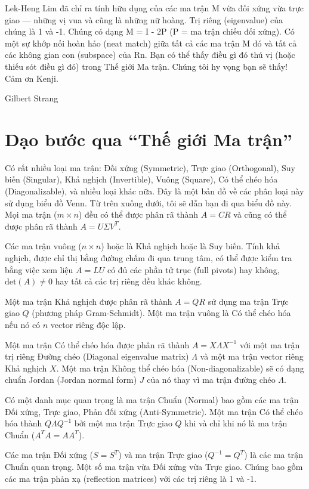 Lek-Heng Lim đã chỉ ra tính hữu dụng của các ma trận M vừa đối xứng vừa trực giao --- những vị vua và cũng là những nữ hoàng. Trị riêng (eigenvalue) của chúng là 1 và -1. Chúng có dạng M = I - 2P (P = ma trận chiếu đối xứng). Có một sự khớp nối hoàn hảo (neat match) giữa tất cả các ma trận M đó và tất cả các không gian con (subspace) của Rn. Bạn có thể thấy điều gì đó thú vị (hoặc thiếu sót điều gì đó) trong Thế giới Ma trận. Chúng tôi hy vọng bạn sẽ thấy! Cảm ơn Kenji.

Gilbert Strang

\section{Dạo bước qua ``Thế giới Ma trận''}

Có rất nhiều loại ma trận: Đối xứng (Symmetric), Trực giao (Orthogonal), Suy biến (Singular), Khả nghịch (Invertible), Vuông (Square), Có thể chéo hóa (Diagonalizable), và nhiều loại khác nữa. Đây là một bản đồ về các phân loại này sử dụng biểu đồ Venn. Từ trên xuống dưới, tôi sẽ dẫn bạn đi qua biểu đồ này. Mọi ma trận ($m \times n$) đều có thể được phân rã thành $A = CR$ và cũng có thể được phân rã thành $A = U\Sigma V^T$.

Các ma trận vuông ($n \times n$) hoặc là Khả nghịch hoặc là Suy biến. Tính khả nghịch, được chỉ thị bằng đường chấm đi qua trung tâm, có thể được kiểm tra bằng việc xem liệu $A = LU$ có đủ các phần tử trục (full pivots) hay không, $\text{det}(A) \neq 0$ hay tất cả các trị riêng đều khác không.

Một ma trận Khả nghịch được phân rã thành $A = QR$ sử dụng ma trận Trực giao $Q$ (phương pháp Gram-Schmidt). Một ma trận vuông là Có thể chéo hóa nếu nó có $n$ vector riêng độc lập.

Một ma trận Có thể chéo hóa được phân rã thành $A = X\Lambda X^{-1}$ với một ma trận trị riêng Đường chéo (Diagonal eigenvalue matrix) $\Lambda$ và một ma trận vector riêng Khả nghịch $X$. Một ma trận Không thể chéo hóa (Non-diagonalizable) sẽ có dạng chuẩn Jordan (Jordan normal form) $J$ của nó thay vì ma trận đường chéo $\Lambda$.

Có một danh mục quan trọng là ma trận Chuẩn (Normal) bao gồm các ma trận Đối xứng, Trực giao, Phản đối xứng (Anti-Symmetric). Một ma trận Có thể chéo hóa thành $Q\Lambda Q^{-1}$ bởi một ma trận Trực giao $Q$ khi và chỉ khi nó là ma trận Chuẩn ($A^T A = A A^T$).

Các ma trận Đối xứng ($S = S^T$) và ma trận Trực giao ($Q^{-1} = Q^T$) là các ma trận Chuẩn quan trọng. Một số ma trận vừa Đối xứng vừa Trực giao. Chúng bao gồm các ma trận phản xạ (reflection matrices) với các trị riêng là 1 và -1.

